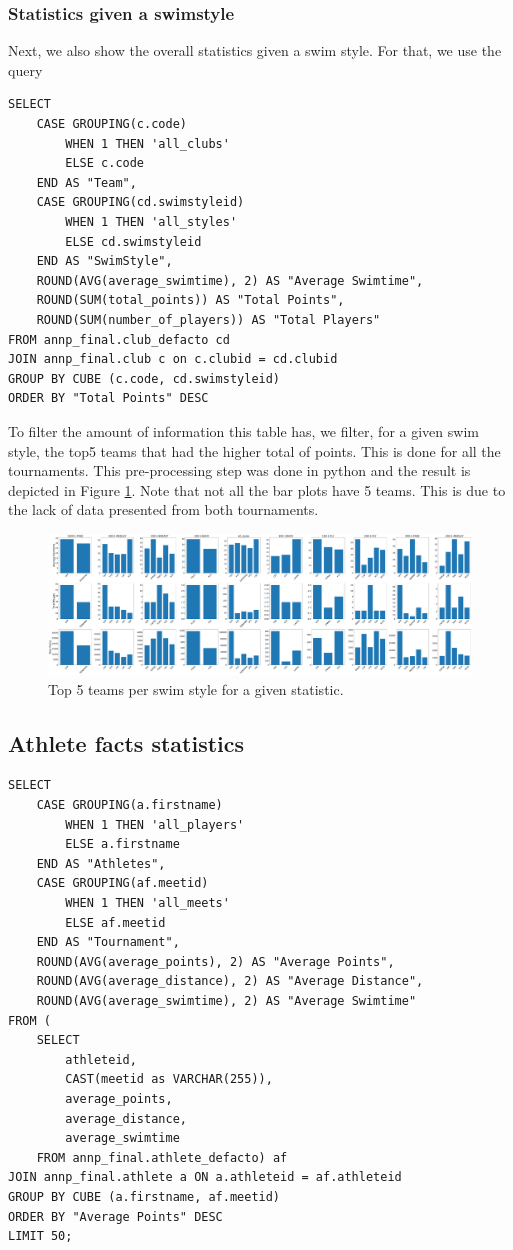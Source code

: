 \subsubsection{Statistics given a swimstyle}

Next, we also show the overall statistics given a swim style. For that, we use the query

\begin{verbatim}
SELECT 
    CASE GROUPING(c.code)
        WHEN 1 THEN 'all_clubs'
        ELSE c.code
    END AS "Team",
    CASE GROUPING(cd.swimstyleid)
        WHEN 1 THEN 'all_styles'
        ELSE cd.swimstyleid
    END AS "SwimStyle",
    ROUND(AVG(average_swimtime), 2) AS "Average Swimtime",
    ROUND(SUM(total_points)) AS "Total Points",
    ROUND(SUM(number_of_players)) AS "Total Players"
FROM annp_final.club_defacto cd
JOIN annp_final.club c on c.clubid = cd.clubid
GROUP BY CUBE (c.code, cd.swimstyleid)
ORDER BY "Total Points" DESC
\end{verbatim}

To filter the amount of information this table has, we filter, for a given swim style, the top5 teams that had the higher total of points. This is done for all the
tournaments. This pre-processing step was done in python and the result is depicted in Figure \ref{fig:clubs_fact2}. Note that not all the bar plots have 5 teams. This
is due to the lack of data presented from both tournaments.

\begin{figure}[H]
    \centering
    \includegraphics[width=\textwidth]{img/stats_clubs_swim.pdf}
    \caption{Top 5 teams per swim style for a given statistic.}
    \label{fig:clubs_fact2}
\end{figure}

\subsection{Athlete facts statistics}

\begin{verbatim}
SELECT
    CASE GROUPING(a.firstname)
        WHEN 1 THEN 'all_players'
        ELSE a.firstname
    END AS "Athletes",
    CASE GROUPING(af.meetid)
        WHEN 1 THEN 'all_meets'
        ELSE af.meetid
    END AS "Tournament",
    ROUND(AVG(average_points), 2) AS "Average Points",
    ROUND(AVG(average_distance), 2) AS "Average Distance",
    ROUND(AVG(average_swimtime), 2) AS "Average Swimtime"
FROM (
    SELECT
        athleteid,
        CAST(meetid as VARCHAR(255)),
        average_points,
        average_distance,
        average_swimtime
    FROM annp_final.athlete_defacto) af
JOIN annp_final.athlete a ON a.athleteid = af.athleteid
GROUP BY CUBE (a.firstname, af.meetid)
ORDER BY "Average Points" DESC
LIMIT 50;
\end{verbatim}


